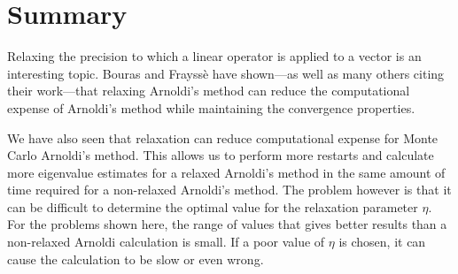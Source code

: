 \begin{comment}
          0.0005 &   124 & 2.481e+09 & 0.9771 $\pm$  9.8\e{-5} &  13476.7 & 7766.4 \\
         0.00075 &   133 & 2.505e+09 & 0.9773 $\pm$  8.0\e{-5} &  19901.5 & 7889.1 \\
           0.001 &   140 & 2.491e+09 & 0.9772 $\pm$  8.3\e{-5} &  18802.3 & 7781.8 \\
          0.0025 &   166 & 2.492e+09 & 0.9772 $\pm$  7.9\e{-5} &  20801.4 & 7783.3 \\
           0.005 &   194 & 2.472e+09 & 0.9771 $\pm$  7.1\e{-5} &  25648.4 & 7728.1 \\
          0.0075 &   224 & 2.475e+09 & 0.9772 $\pm$  7.5\e{-5} &  23183.8 & 7746.0 \\
            0.01 &   262 & 2.501e+09 & 0.9772 $\pm$  6.8\e{-5} &  27836.6 & 7840.6 \\
            0.05 &   817 & 2.520e+09 & 0.9771 $\pm$  1.0\e{-4} &  11794.3 & 7871.5 \\
             0.1 &  1173 & 2.483e+09 & 0.9768 $\pm$  1.3\e{-4} &   7982.5 & 7832.0 \\
            0.25 &  1649 & 2.503e+09 & 0.9766 $\pm$  1.5\e{-4} &   6002.6 & 7918.0 \\
             0.5 &  1917 & 2.506e+09 & 0.9766 $\pm$  1.5\e{-4} &   5904.3 & 7921.6 \\
            0.75 &  2037 & 2.515e+09 & 0.9766 $\pm$  1.5\e{-4} &   5354.7 & 7944.6 \\
               1 &  2090 & 2.496e+09 & 0.9767 $\pm$  1.5\e{-4} &   5320.2 & 7953.4 \\
        \bottomrule
    \end{tabular}
    \caption{Second higher order eigenvalue estimates with relaxation.}
    \label{tab:Linear2}
\end{table}
\end{comment}

\section{Summary}
Relaxing the precision to which a linear operator is applied to a vector is an interesting topic.  Bouras and Frayss\`{e} have shown---as well as many others citing their work---that relaxing Arnoldi's method can reduce the computational expense of Arnoldi's method while maintaining the convergence properties.  

We have also seen that relaxation can reduce computational expense for Monte Carlo Arnoldi's method.  This allows us to perform more restarts and calculate more eigenvalue estimates for a relaxed Arnoldi's method in the same amount of time required for a non-relaxed Arnoldi's method.  The problem however is that it can be difficult to determine the optimal value for the relaxation parameter $\eta$.  For the problems shown here, the range of values that gives better results than a non-relaxed Arnoldi calculation is small.  If a poor value of $\eta$ is chosen, it can cause the calculation to be slow or even wrong.

